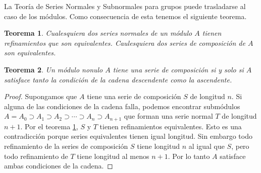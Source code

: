 \documentclass{report}
\newtheorem{theorem}{Teorema}
\begin{document}
  La Teoría de Series Normales y Subnormales para grupos puede trasladarse al caso de los módulos.
  Como consecuencia de esta tenemos el siguiente teorema.
  \begin{theorem}
    \label{theorem:refinementAndEquivalenceOfNormalSeries}
    Cualesquiera dos series normales de un módulo \(A\) tienen refinamientos que son equivalentes.
    Caulesquiera dos series de composición de \(A\) son equivalentes.
  \end{theorem}


  \begin{theorem}
    \label{theorem:compositionSeriesAndChainConditions}
    Un módulo nonulo \(A\) tiene una serie de composición si y solo si \(A\) satisface tanto la condición de la cadena descendente como la ascendente.
  \end{theorem}
  \begin{proof}
    Supongamos que \(A\) tiene una serie de composición \(S\) de longitud \(n\).
    Si alguna de las condiciones de la cadena falla, podemos encontrar submódulos \(A = A_0 \supset A_1 \supset A_2 \supset \cdots \supset A_n \supset A_{n + 1}\)
    que forman una serie normal \(T\) de longitud \(n + 1\).
    Por el teorema \ref{theorem:refinementAndEquivalenceOfNormalSeries}, \(S\) y \(T\) tienen refinamientos equivalentes.
    Esto es una contradicción porque series equivalentes tienen igual longitud.
    Sin embargo todo refinamiento de la series de composición \(S\) tiene longitud \(n\) al igual que \(S\), pero todo refinamiento de \(T\) tiene longitud al menos \(n + 1\).
    Por lo tanto \(A\) satisface ambas condiciones de la cadena.


\end{proof}
\end{document}
